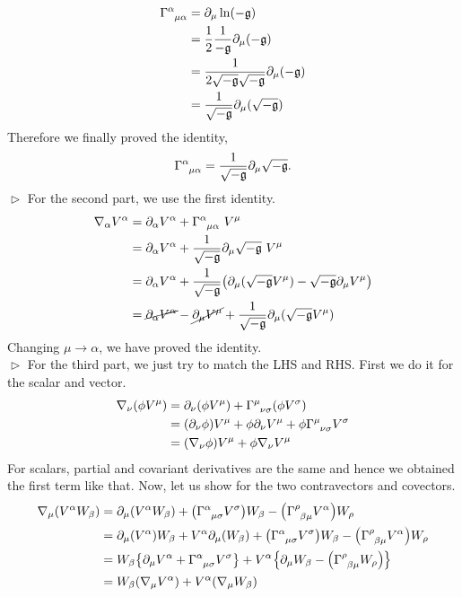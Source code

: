 \begin{align*}
      \chris{\alpha}{\mu}{\alpha} &=\partial_\mu \ln (-\detg) \\
      &=\frac{1}{2} \frac{1}{-\detg} \partial_\mu(-\detg)\\
      &=\frac{1}{2\sqrt{-\detg}\sqrt{-\detg}}\partial_\mu(-\detg)\\
      &=\frac{1}{\sqrt{-\detg}}\partial_\mu(\sqrt{-\detg})
\end{align*}
Therefore we finally proved the identity,
\[
\chris{\alpha}{\mu}{\alpha} = \frac{1}{\sqrt{-\detg}} \partial_\mu \sqrt{-\detg}.
\]
$\vartriangleright$ For the second part, we use the first identity. 
\begin{align*}
    \covd{\alpha}V^\alpha &= \partial_\alpha V^\alpha + \chris{\alpha}{\mu}{\alpha}\ V^\mu\\
&= \partial_\alpha V^\alpha + \frac{1}{\sqrt{-\detg}} \partial_\mu \sqrt{-\detg}\ V^\mu\\
&= \partial_\alpha V^\alpha + \frac{1}{\sqrt{-\detg}} \qty(\partial_\mu (\sqrt{-\detg}V^\mu) -\sqrt{-\detg} \partial_\mu V^\mu)\\
&=\cancel{\partial_\alpha V^\alpha} - \cancel{\partial_\mu V^\mu} + \frac{1}{\sqrt{-\detg}}\partial_\mu (\sqrt{-\detg}V^\mu)
\end{align*}
Changing $\mu \to \alpha$, we have proved the identity. \\
$\vartriangleright$ For the third part, we just try to match the LHS and RHS. First we do it for the scalar and vector.
\begin{align*}
    \covd{\nu}(\phi V^\mu) &= \partial_\nu (\phi V^\mu) + \chris{\mu}{\nu}{\sigma}(\phi V^\sigma)\\
    &=(\partial_\nu \phi)V^\mu +\phi \partial_\nu V^\mu + \phi  \chris{\mu}{\nu}{\sigma} V^\sigma\\
    &=(\covd{\nu}\phi)V^\mu + \phi\covd{\nu}V^\mu
\end{align*}
For scalars, partial and covariant derivatives are the same and hence we obtained the first term like that. Now, let us show for the two contravectors and covectors. 
\begin{align*}
    \covd{\mu}( V^\alpha W_\beta) &= \partial_\mu ( V^\alpha W_\beta) + \qty(\chris{\alpha}{\mu}{\sigma}V^\sigma) W_\beta -\qty(\chris{\rho}{\beta}{\mu} V^\alpha) W_{\rho}\\
    &=\partial_\mu ( V^\alpha )W_\beta+V^\alpha\partial_\mu ( W_\beta) + \qty(\chris{\alpha}{\mu}{\sigma}V^\sigma) W_\beta -\qty(\chris{\rho}{\beta}{\mu} V^\alpha) W_{\rho}\\
    &=W_\beta\qty{\partial_\mu  V^\alpha +  \chris{\alpha}{\mu}{\sigma}V^\sigma } + V^\alpha \qty{\partial_\mu  W_\beta -\qty(\chris{\rho}{\beta}{\mu} W_{\rho}) }\\
    &=W_\beta (\covd{\mu}V^\alpha) + V^\alpha (\covd{\mu} W_\beta)
\end{align*}
